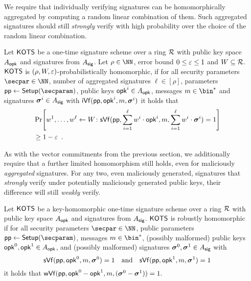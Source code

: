 We require that individually verifying signatures can be homomorphically aggregated by computing a random linear combination of them.
Such aggregated signatures should still \emph{strongly} verify with high probability over the choice of the random linear combination.

\begin{definition}
  Let $\mathsf{KOTS}$ be a one-time signature scheme over a ring $\mathcal{R}$ with public key space $A_{\mathsf{opk}}$ and signatures from $A_{\mathsf{sig}}$.
  Let $\rho \in \NN$, error bound $0\leq \varepsilon \leq 1$ and $W\subseteq \mathcal{R}$.
  $\mathsf{KOTS}$ is $(\rho,W,\varepsilon)$-probabilistically homomorphic, if 
  for all security parameters $\secpar\in\NN$, number of aggregated signatures $\ell\in[\rho]$, parameters $\params \gets \setup(\secparam)$, public keys $\mathsf{opk}^i \in A_{\mathsf{opk}}$, messages $m\in\bin^*$ and signatures $\boldsymbol{\sigma}^i\in A_{\mathsf{sig}}$ with $\mathsf{iVf}(\mathsf{pp},\mathsf{opk}^i,m,\boldsymbol{\sigma}^i)$ it holds that
  \begin{align*}
    &\Pr\mleft[
      w^1,\dots,w^\ell\gets W
      \colon
      \sverify(\params,\sum_{i=1}^{\ell}w^i\cdot\opk^i,m,\sum_{i=1}^{\ell}w^i\cdot\vec{\sigma}^i) = 1
    \mright] \\
    &\geq 1-\errorbound\enspace.
  \end{align*}
\end{definition}

As with the vector commitments from the previous section, we additionally require that a further limited homomorphism still holds, even for maliciously \emph{aggregated} signatures.
For any two, even maliciously generated, signatures that \emph{strongly} verify under potentially maliciously generated public keys, their difference will still \emph{weakly} verify.

\begin{definition}
  \label{def:malhomhots}
  Let $\mathsf{KOTS}$ be a key-{}homo\-morphic one-time signature scheme over a ring $\mathcal{R}$ with public key space $A_{\mathsf{opk}}$ and signatures from $A_{\mathsf{sig}}$.
  $\mathsf{KOTS}$ is robustly homomorphic if for all security parameters $\secpar\in\NN$, public parameters $\params\gets\setup(\secparam)$, messages $m\in\bin^*$, (possibly malformed) public keys $\mathsf{opk}^0,\mathsf{opk}^1 \in A_{\mathsf{opk}}$, and (possibly malformed) signatures $\boldsymbol{\sigma}^0,\boldsymbol{\sigma}^1\in A_{\mathsf{sig}}$ with
  \[
    \mathsf{sVf}(\mathsf{pp},\mathsf{opk}^0, m,\boldsymbol{\sigma}^0)=1 \quad \text{and} \quad \mathsf{sVf}(\mathsf{pp},\mathsf{opk}^1, m,\boldsymbol{\sigma}^1)=1
  \]
  it holds that
  $
    \mathsf{wVf}(\mathsf{pp},\mathsf{opk}^0-\mathsf{opk}^1, m,(\boldsymbol{\sigma}^0-\boldsymbol{\sigma}^1))=1.
  $
\end{definition}

